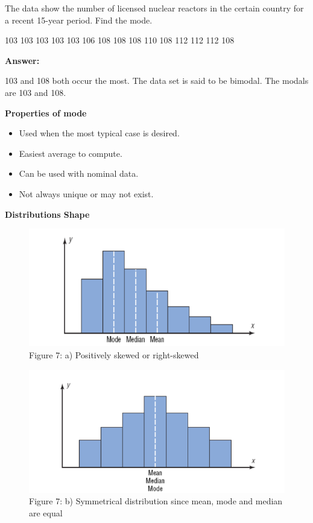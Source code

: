 \documentclass[
  a4paper,
  DIV=11,
  numbers=noendperiod,
  oneside]{scrreprt}
\providecommand{\tightlist}{%
  \setlength{\itemsep}{0pt}\setlength{\parskip}{0pt}}\usepackage{longtable,booktabs,array}
\begin{document}
The data show the number of licensed nuclear reactors in the certain
country for a recent 15-year period. Find the mode.

103 103 103 103 103 106 108 108 108 110 108 112 112 112 108

{\textbf{Answer:}}

103 and 108 both occur the most. The data set is said to be bimodal. The
modals are 103 and 108.

\textbf{Properties of mode}

\begin{itemize}
\tightlist
\item
  Used when the most typical case is desired.
\item
  Easiest average to compute.
\item
  Can be used with nominal data.
\item
  Not always unique or may not exist.
\end{itemize}

\textbf{Distributions Shape}

\begin{figure}

{\centering \includegraphics[width=5.20833in,height=\textheight]{images/ch2/picture10.png}

}

\caption{Figure 7: a) Positively skewed or right-skewed}

\end{figure}

\begin{figure}

{\centering \includegraphics[width=5.20833in,height=\textheight]{images/ch2/picture11.png}

}

\caption{Figure 7: b) Symmetrical distribution since mean, mode and
median are equal}

\end{figure}
\end{document}
